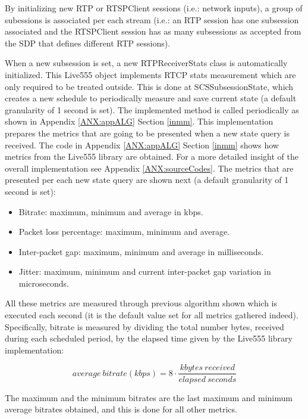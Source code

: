 By initializing new RTP or RTSPClient sessions (i.e.: network inputs), a group of subessions is associated per each stream (i.e.: an RTP session has one subsession associated and the RTSPClient session has as many subsessions as accepted from the SDP that defines different RTP sessions).

When a new subsession is set, a new RTPReceiverStats class is automatically initialized. This Live555 object implements RTCP stats measurement which are only required to be treated outside. This is done at SCSSubsessionState, which creates a new schedule to periodically measure and save current state (a default granularity of 1 second is set). The implemented method is called periodically as shown in Appendix \ref{ANX:appALG} Section \ref{inmm}. This implementation prepares the metrics that are going to be presented when a new state query is received. The code in Appendix \ref{ANX:appALG} Section \ref{inmm} shows how metrics from the Live555 library are obtained. For a more detailed insight of the overall implementation see Appendix \ref{ANX:sourceCodes}. The metrics that are presented per each new state query are shown next (a default granularity of 1 second is set):

\begin{itemize}
\item Bitrate: maximum, minimum and average in kbps.
\item Packet loss percentage: maximum, minimum and average.
\item Inter-packet gap: maximum, minimum and average in milliseconds.
\item Jitter: maximum, minimum and current inter-packet gap variation in microseconds.
\end{itemize}

All these metrics are measured through previous algorithm shown which is executed each second (it is the default value set for all metrics gathered indeed). Specifically, bitrate is measured by dividing the total number bytes, received during each scheduled period, by the elapsed time given by the Live555 library implementation:

\begin{equation}\label{E:bitrate}
average\ bitrate (kbps) = 8 \cdot \frac{kbytes\ received}{elapsed\ seconds}
\end{equation}

The maximum and the minimum bitrates are the last maximum and minimum average bitrates obtained, and this is done for all other metrics.

